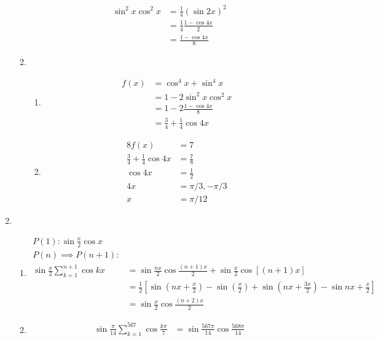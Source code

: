 \documentclass[12pt]{article}
\begin{document}
\begin{enumerate}
\begin{enumerate}
\begin{align*}
                \sin^2{x}\cos^2{x}&=\frac{1}{4}(\sin{2x})^2\\
                &=\frac{1}{4}\frac{1-\cos{4x}}{2}\\
                &=\frac{1-\cos{4x}}{8}
            \end{align*}
            \item \begin{enumerate}
                \item \begin{align*}
                    f(x)&=\cos^4{x}+\sin^4{x}\\
                    &=1-2\sin^2{x}\cos^2{x}\\
                    &=1-2\frac{1-\cos{4x}}{8}\\
                    &=\frac{3}{4}+\frac{1}{4}\cos{4x}
                \end{align*}
                \item \begin{align*}
                    8f(x)&=7\\
                    \frac{3}{4}+\frac{1}{4}\cos{4x}&=\frac{7}{8}\\
                    \cos{4x}&=\frac{1}{2}\\
                    4x&=\pi/3, -\pi/3\\
                    x&=\pi/12
                \end{align*}
            \end{enumerate}
        \end{enumerate}
        \item \begin{enumerate}
            \item \begin{align*}
                P(1):\sin{\frac{x}{2}}\cos{x}\\
                P(n)\implies P(n+1):\\
                \sin{\frac{x}{2}}\sum_{k=1}^{n+1}\cos{kx}&=\sin{\frac{nx}{2}}\cos{\frac{(n+1)x}{2}}+\sin{\frac{x}{2}}\cos[(n+1)x]\\
                &=\frac{1}{2}[\sin(nx+\frac{x}{2})-\sin(\frac{x}{2})+\sin(nx+\frac{3x}{2})-\sin{nx+\frac{x}{2}}]\\
                &=\sin{\frac{x}{2}}\cos{\frac{(n+2)x}{2}}
            \end{align*}
            \item \begin{align*}
                \sin{\frac{\pi}{14}}\sum_{k=1}^{567}\cos{\frac{k\pi}{7}}&=\sin{\frac{567\pi}{14}}\cos{\frac{568\pi}{14}}\\

\end{align*}
\end{enumerate}
\end{enumerate}
\end{document}
